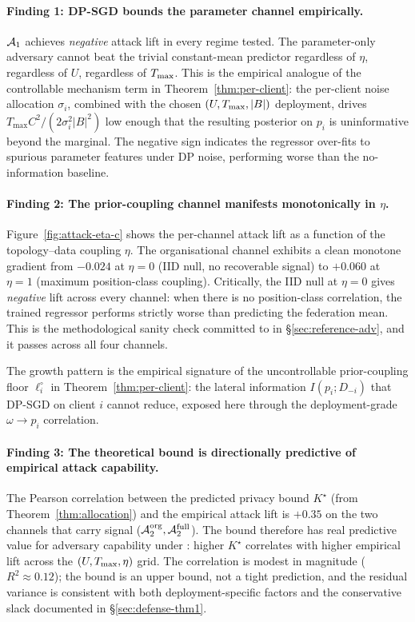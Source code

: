 \paragraph{Finding 1: DP-SGD bounds the parameter channel
empirically.}
$\mathcal{A}_1$ achieves \emph{negative} attack lift in every regime tested.
The parameter-only adversary cannot beat the trivial constant-mean
predictor regardless of $\eta$, regardless of $U$, regardless of
$T_{\max}$. This is the empirical analogue of the controllable mechanism
term in Theorem~\ref{thm:per-client}: the per-client noise allocation
$\sigma_i$, combined with the chosen $(U, T_{\max}, |B|)$ deployment,
drives $T_{\max} C^2/(2\sigma_i^2|B|^2)$ low enough that the resulting
posterior on $p_i$ is uninformative beyond the marginal. The negative
sign indicates the regressor over-fits to spurious parameter features
under DP noise, performing worse than the no-information baseline.

\paragraph{Finding 2: The prior-coupling channel manifests
monotonically in $\eta$.}
Figure~\ref{fig:attack-eta-c} shows the per-channel attack lift as a
function of the topology--data coupling $\eta$. The organisational
channel exhibits a clean monotone gradient from $-0.024$ at $\eta=0$
(IID null, no recoverable signal) to $+0.060$ at $\eta=1$ (maximum
position-class coupling). Critically, the IID null at $\eta=0$ gives
\emph{negative} lift across every channel: when there is no
position-class correlation, the trained regressor performs strictly
worse than predicting the federation mean. This is the methodological
sanity check committed to in \S\ref{sec:reference-adv}, and it passes
across all four channels.

The growth pattern is the empirical signature of the uncontrollable
prior-coupling floor $\ell_i^\circ$ in Theorem~\ref{thm:per-client}:
the lateral information $I(p_i; D_{-i})$ that DP-SGD on client $i$
cannot reduce, exposed here through the deployment-grade
$\omega \to p_i$ correlation.

\paragraph{Finding 3: The theoretical bound is directionally
predictive of empirical attack capability.}
The Pearson correlation between the predicted privacy bound $K^\star$
(from Theorem~\ref{thm:allocation}) and the empirical attack lift is
$+0.35$ on the two channels that carry signal
($\mathcal{A}_2^{\text{org}}, \mathcal{A}_2^{\text{full}}$). The bound therefore has
real predictive value for adversary capability under \TADI: higher
$K^\star$ correlates with higher empirical lift across the
$(U, T_{\max}, \eta)$ grid. The correlation is modest in magnitude
($R^2 \approx 0.12$); the bound is an upper bound, not a tight
prediction, and the residual variance is consistent with both
deployment-specific factors and the conservative slack documented in
\S\ref{sec:defense-thm1}.

